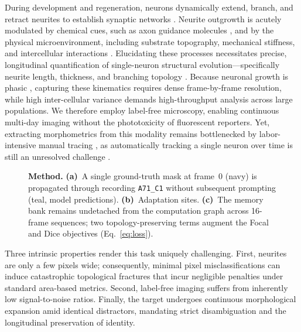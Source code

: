 \documentclass{article}
\begin{document}
During development and regeneration, neurons dynamically extend, branch, and retract neurites to establish synaptic networks \cite{dotti1988polarity,lowery2009growthcone}. Neurite outgrowth is acutely modulated by chemical cues, such as axon guidance molecules \cite{lowery2009growthcone}, and by the physical microenvironment, including substrate topography, mechanical stiffness, and intercellular interactions \cite{shefi2005twophase,baranes2012topographic,marcus2017interactions}. Elucidating these processes necessitates precise, longitudinal quantification of single-neuron structural evolution---specifically neurite length, thickness, and branching topology \cite{odde1996stochastic}. Because neuronal growth is phasic \cite{shefi2005twophase,berkovich2025neurite}, capturing these kinematics requires dense frame-by-frame resolution, while high inter-cellular variance demands high-throughput analysis across large populations. We therefore employ label-free microscopy, enabling continuous multi-day imaging without the phototoxicity of fluorescent reporters. Yet, extracting morphometrics from this modality remains bottlenecked by labor-intensive manual tracing \cite{longair2011snt,berkovich2025neurite}, as automatically tracking a single neuron over time is still an unresolved challenge \cite{maska2023ctc}.

\begin{figure}[t]
\centering

\caption{\textbf{Method.} \textbf{(a)}~A single ground-truth mask at frame~0 (navy) is propagated through recording \texttt{A71\_C1} without subsequent prompting (teal, model predictions). \textbf{(b)}~Adaptation sites. \textbf{(c)}~The memory bank remains undetached from the computation graph across 16-frame sequences; two topology-preserving terms augment the Focal and Dice objectives (Eq.~\ref{eq:loss}).}
\label{fig:method}
\end{figure}

Three intrinsic properties render this task uniquely challenging. First, neurites are only a few pixels wide; consequently, minimal pixel misclassifications can induce catastrophic topological fractures that incur negligible penalties under standard area-based metrics. Second, label-free imaging suffers from inherently low signal-to-noise ratios. Finally, the target undergoes continuous morphological expansion amid identical distractors, mandating strict disambiguation and the longitudinal preservation of identity.
\end{document}
